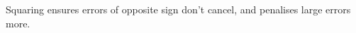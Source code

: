 \documentclass[preview]{standalone}
\begin{document}
\begin{center}
Squaring ensures errors of opposite sign don't cancel, and penalises large errors more.
\end{center}
\end{document}
